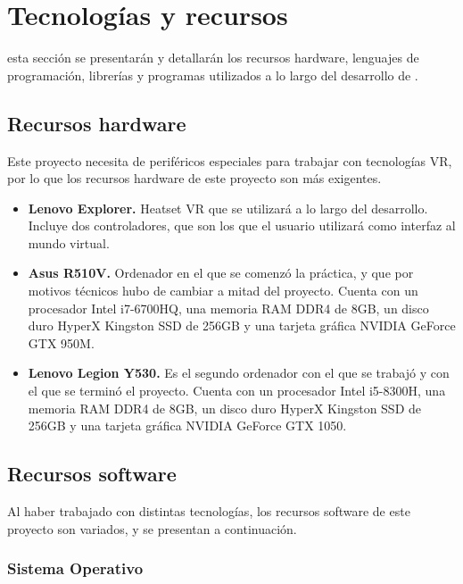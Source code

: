 \chapter{Tecnologías y recursos}
\label{chap:tecnologia}

 esta sección se presentarán y detallarán los recursos hardware, lenguajes de programación, librerías y programas utilizados a lo largo del desarrollo de \MineRVa.

\section{Recursos hardware}

Este proyecto necesita de periféricos especiales para trabajar con tecnologías \acs{VR}, por lo que los recursos hardware de este proyecto son más exigentes.

\begin{itemize}
 \item \textbf{Lenovo Explorer.} Heatset \acs{VR} que se utilizará a lo largo del desarrollo. Incluye dos controladores, que son los que el usuario utilizará como interfaz al mundo virtual.

 \item \textbf{Asus R510V.} Ordenador en el que se comenzó la práctica, y que por motivos técnicos hubo de cambiar a mitad del proyecto. Cuenta con un procesador Intel i7-6700HQ, una memoria RAM DDR4 de 8GB, un disco duro HyperX Kingston SSD de 256GB y una tarjeta gráfica NVIDIA GeForce GTX 950M.
 
 \item \textbf{Lenovo Legion Y530.} Es el segundo ordenador con el que se trabajó y con el que se terminó el proyecto. Cuenta con un procesador Intel i5-8300H, una memoria RAM DDR4 de 8GB, un disco duro  HyperX Kingston SSD de 256GB y una tarjeta gráfica NVIDIA GeForce GTX 1050.
 
\end{itemize}

\section{Recursos software}

Al haber trabajado con distintas tecnologías, los recursos software de este proyecto son variados, y se presentan a continuación.

\subsection{Sistema Operativo}

